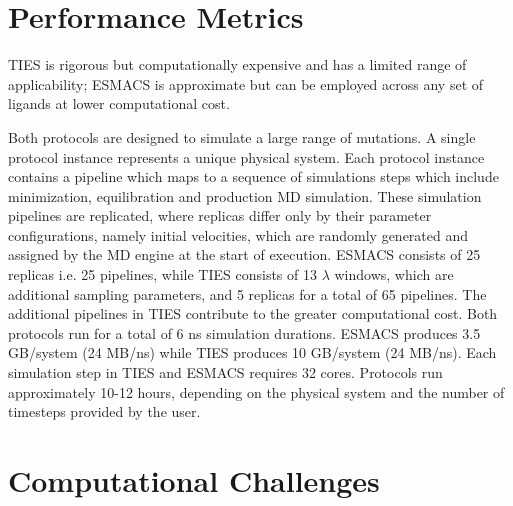 \documentclass[conference]{IEEEtran}
\begin{document}
\section{Performance Metrics}\label{sec:performance}

TIES is rigorous but computationally expensive and has a limited range of
applicability; ESMACS is approximate but can be employed across any set of
ligands at lower computational cost. 


Both protocols are designed to simulate a large range of mutations. A single 
protocol instance represents a unique physical system. Each protocol instance
contains a pipeline which maps to a sequence of simulations steps which include
minimization, equilibration and production MD simulation. 
These simulation pipelines are replicated, where replicas differ 
only by their parameter configurations,
namely initial velocities, which are randomly generated and assigned by the MD
engine at the start of execution. ESMACS consists of 25 replicas i.e. 
25 pipelines, while TIES 
consists of 13 $\lambda$ windows, which are additional sampling parameters,
and 5 replicas for a total of 65 pipelines. The additional pipelines in TIES 
contribute to the greater computational cost. Both protocols run for a total of 
6 ns simulation durations. ESMACS produces 3.5 GB/system (24 MB/ns) while 
TIES produces 10 GB/system (24 MB/ns). Each simulation step in TIES and ESMACS 
requires 32 cores. Protocols run approximately 10-12 hours, 
depending on the physical system and the number of timesteps provided by the 
user. 




\section{Computational Challenges}\label{sec:cc}


\end{document}
